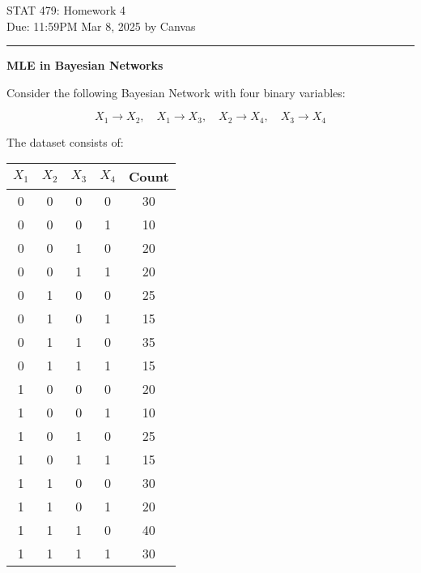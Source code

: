 \documentclass[12pt,letterpaper, onecolumn]{exam}
\begin{document}
\begingroup  
    \centering
    \LARGE STAT 479: Homework 4\\[0.5em]
    \large Due: 11:59PM Mar 8, 2025 by Canvas\\[0.5em]
\endgroup
\rule{\textwidth}{0.4pt}
\pointsdroppedatright   %
\printanswers
\renewcommand{\solutiontitle}{\noindent\textbf{Answer:}\enspace}

\vspace{-20pt}
\begin{questions}
\vspace{-10pt}


\question[20 points] \textbf{MLE in Bayesian Networks}\droppoints

Consider the following Bayesian Network with four binary variables:

\[
X_1 \rightarrow X_2, \quad X_1 \rightarrow X_3, \quad X_2 \rightarrow X_4, \quad X_3 \rightarrow X_4
\]

The dataset consists of:

\begin{center}
\begin{tabular}{cccc|c}
\toprule
$X_1$ & $X_2$ & $X_3$ & $X_4$ & \textbf{Count} \\
\midrule
0 & 0 & 0 & 0 & 30 \\
0 & 0 & 0 & 1 & 10 \\
0 & 0 & 1 & 0 & 20 \\
0 & 0 & 1 & 1 & 20 \\
0 & 1 & 0 & 0 & 25 \\
0 & 1 & 0 & 1 & 15 \\
0 & 1 & 1 & 0 & 35 \\
0 & 1 & 1 & 1 & 15 \\
1 & 0 & 0 & 0 & 20 \\
1 & 0 & 0 & 1 & 10 \\
1 & 0 & 1 & 0 & 25 \\
1 & 0 & 1 & 1 & 15 \\
1 & 1 & 0 & 0 & 30 \\
1 & 1 & 0 & 1 & 20 \\
1 & 1 & 1 & 0 & 40 \\
1 & 1 & 1 & 1 & 30 \\
\bottomrule
\end{tabular}
\end{center}

\end{questions}
\end{document}
